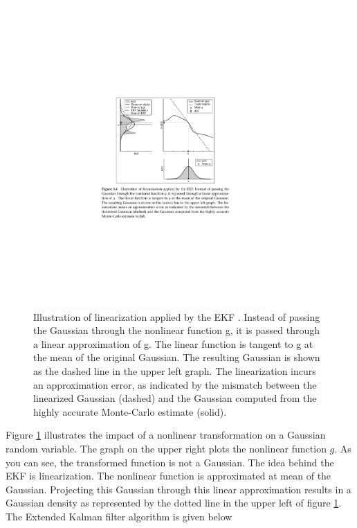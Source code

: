 \documentclass[conference]{IEEEtran}
\begin{document}
\begin{figure}[!t]
\centering
\includegraphics[width=3.5in]{./figures/EkfXform.pdf}
\caption{Illustration of linearization applied by the EKF \cite{thrun}. Instead of passing the Gaussian through the nonlinear function g, it is passed through a linear approximation of g. The linear function is tangent to g at the mean of the original Gaussian. The resulting Gaussian is shown as the dashed line in the upper left graph. The linearization incurs an approximation error, as indicated by the mismatch between the linearized Gaussian (dashed) and the Gaussian computed from the highly accurate Monte-Carlo estimate (solid).}
\label{EkfXform}
\end{figure}

Figure \ref{EkfXform} illustrates the impact of a nonlinear transformation on a Gaussian random variable. The graph on the upper right plots the nonlinear function $g$. As you can see, the transformed function is not a Gaussian. The idea behind the EKF is linearization. The nonlinear function is approximated at mean of the Gaussian. Projecting this Gaussian through this linear approximation results in a Gaussian density as represented by the dotted line in the upper left of figure \ref{EkfXform}.\\

The Extended Kalman filter algorithm is given below \cite{thrun}
\end{document}
